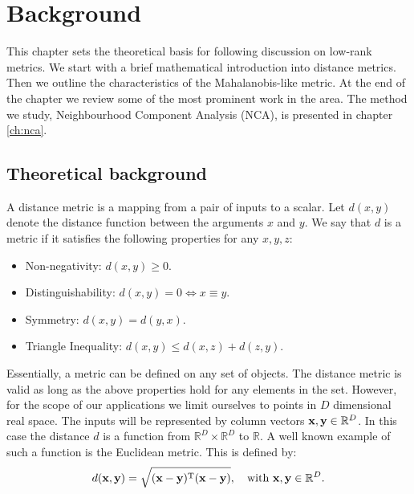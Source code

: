 \chapter{Background}

This chapter sets the theoretical basis for following discussion on low-rank metrics. We start with a brief mathematical introduction into distance metrics. Then we outline the characteristics of the Mahalanobis-like metric. At the end of the chapter we review some of the most prominent work in the area. The method we study, Neighbourhood Component Analysis (NCA), is presented in chapter \ref{ch:nca}.

\section{Theoretical background}
\label{sec:theoretical-background}
  A distance metric is a mapping from a pair of inputs to a scalar. Let $d(x,y)$ denote the distance function between the arguments $x$ and $y$. We say that $d$ is a metric if it satisfies the following properties for any $x,y,z$:
	\begin{itemize}
		\item Non-negativity: $d(x,y) \ge 0$.
		\item Distinguishability: $d(x,y)=0 \Leftrightarrow  x\equiv y$.
		\item Symmetry: $d(x,y)=d(y,x)$.
		\item Triangle Inequality: $d(x,y)\leq d(x,z) + d(z,y)$.
	\end{itemize}
	
	Essentially, a metric can be defined on any set of objects. The distance metric is valid as long as the above properties hold for any elements in the set. However, for the scope of our applications we limit ourselves to points in $D$ dimensional real space. The inputs will be represented by column vectors $\mathbf{x},\mathbf{y} \in \mathbb{R}^D$. In this case the distance $d$ is a function from $\mathbb{R}^D\times\mathbb{R}^D$ to $\mathbb{R}$. A well known example of such a function is the Euclidean metric. This is defined by:
	\begin{align}
		 d(\mathbf{x},\mathbf{y}) = \sqrt{(\mathbf{x-y})^\textrm{T}(\mathbf{x-y})}, \quad\mbox{with }\mathbf{x,y}\in \mathbb{R}^D.
	\end{align}
	
